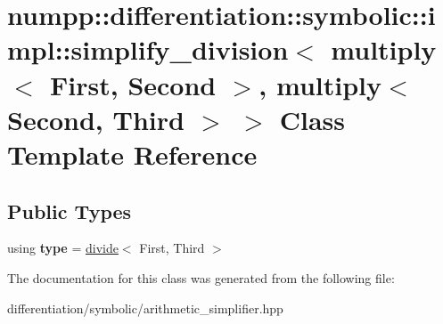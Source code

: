 \hypertarget{classnumpp_1_1differentiation_1_1symbolic_1_1impl_1_1simplify__division_3_01multiply_3_01First_009a599186e504c392075b7a47787417d}{}\section{numpp\+:\+:differentiation\+:\+:symbolic\+:\+:impl\+:\+:simplify\+\_\+division$<$ multiply$<$ First, Second $>$, multiply$<$ Second, Third $>$ $>$ Class Template Reference}
\label{classnumpp_1_1differentiation_1_1symbolic_1_1impl_1_1simplify__division_3_01multiply_3_01First_009a599186e504c392075b7a47787417d}
\subsection*{Public Types}
\begin{DoxyCompactItemize}
\item 
\mbox{\label{classnumpp_1_1differentiation_1_1symbolic_1_1impl_1_1simplify__division_3_01multiply_3_01First_009a599186e504c392075b7a47787417d_a3f3274e84343d13280a3399c8a6ee747}} 
using {\bfseries type} = \hyperlink{classnumpp_1_1differentiation_1_1symbolic_1_1divide}{divide}$<$ First, Third $>$
\end{DoxyCompactItemize}


The documentation for this class was generated from the following file\+:\begin{DoxyCompactItemize}
\item 
differentiation/symbolic/arithmetic\+\_\+simplifier.\+hpp\end{DoxyCompactItemize}
